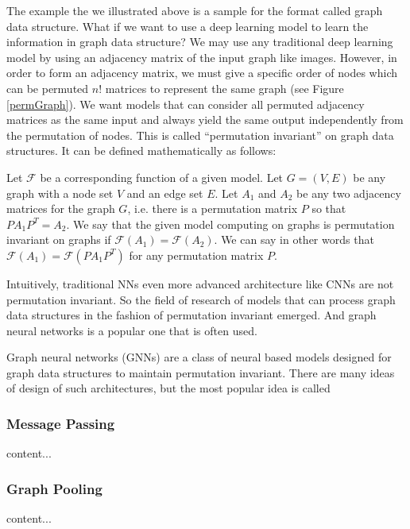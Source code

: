 The example the we illustrated above is a sample for the format called graph data structure.
What if we want to use a deep learning model to learn the information in graph data structure?
We may use any traditional deep learning model by using an adjacency matrix of the input graph like images.
However, in order to form an adjacency matrix, we must give a specific order of nodes which can be permuted $n!$ matrices to represent the same graph (see Figure \ref{permGraph}).
We want models that can consider all permuted adjacency matrices as the same input and always yield the same output independently from the permutation of nodes.
This is called ``permutation invariant'' on graph data structures. It can be defined mathematically as follows:

\begin{defi}
	Let $\mathcal{F}$ be a corresponding function of a given model.
	Let $G = (V,E)$ be any graph with a node set $V$ and an edge set $E$.
	Let $A_1$ and $A_2$ be any two adjacency matrices for the graph $G$, i.e. there is a permutation matrix $P$ so that $PA_1P^T = A_2 $.
	We say that the given model computing on graphs is permutation invariant on graphs if $\mathcal{F}(A_1) = \mathcal{F}(A_2)$.
	We can say in other words that $\mathcal{F}(A_1) = \mathcal{F}(PA_1P^T)$ for any permutation matrix $P$.
\end{defi}

Intuitively, traditional NNs even more advanced architecture like CNNs are not permutation invariant. So the field of research of models that can process graph data structures in the fashion of permutation invariant emerged. And graph neural networks is a popular one that is often used.

Graph neural networks (GNNs) are a class of neural based models designed for graph data structures to maintain permutation invariant.
There are many ideas of design of such architectures, but the most popular idea is called 

\subsubsection{Message Passing}
content...

\subsubsection{Graph Pooling}
content...

